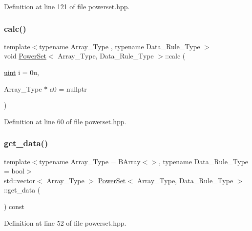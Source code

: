 Definition at line 121 of file powerset.\+hpp.

\mbox{\label{class_power_set_ab15a2b22478e72f351b8ac11392d22c6}} 
\subsubsection{\texorpdfstring{calc()}{calc()}}
{\footnotesize\ttfamily template$<$typename Array\+\_\+\+Type , typename Data\+\_\+\+Rule\+\_\+\+Type $>$ \\
void \hyperlink{class_power_set}{Power\+Set}$<$ Array\+\_\+\+Type, Data\+\_\+\+Rule\+\_\+\+Type $>$\+::calc (\begin{DoxyParamCaption}\item[{\hyperlink{typedefs_8hpp_a91ad9478d81a7aaf2593e8d9c3d06a14}{uint}}]{i = {\ttfamily 0u},  }\item[{Array\+\_\+\+Type $\ast$}]{a0 = {\ttfamily nullptr} }\end{DoxyParamCaption})\hspace{0.3cm}{\ttfamily [inline]}}



Definition at line 60 of file powerset.\+hpp.

\mbox{\label{class_power_set_a4de44631d9a7967db4dd791d42166115}} 
\subsubsection{\texorpdfstring{get\+\_\+data()}{get\_data()}}
{\footnotesize\ttfamily template$<$typename Array\+\_\+\+Type  = B\+Array$<$$>$, typename Data\+\_\+\+Rule\+\_\+\+Type  = bool$>$ \\
std\+::vector$<$ Array\+\_\+\+Type $>$ \hyperlink{class_power_set}{Power\+Set}$<$ Array\+\_\+\+Type, Data\+\_\+\+Rule\+\_\+\+Type $>$\+::get\+\_\+data (\begin{DoxyParamCaption}{ }\end{DoxyParamCaption}) const\hspace{0.3cm}{\ttfamily [inline]}}



Definition at line 52 of file powerset.\+hpp.

\mbox{\label{class_power_set_a99cf1aa56e63a16c023bf7057b0b9288}} 

